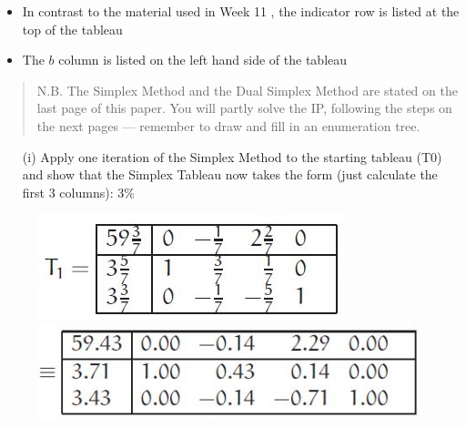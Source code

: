 \documentclass{beamer}
\begin{document}

\begin{frame}
\begin{itemize}
\item In contrast to the material used in Week 11 , the indicator row is listed at the top of the tableau
\item The $b$ column is listed on the left hand side of the tableau
\end{itemize}
\end{frame}
\begin{frame}
\begin{quote}
N.B. The Simplex Method and the Dual Simplex Method are stated on
the last page of this paper.
You will partly solve the IP, following the steps on the next pages — remember
to draw and fill in an enumeration tree.
\end{quote}
\end{frame}
\begin{frame}
\begin{itemize}
\item[(i)] Apply one iteration of the Simplex Method to the starting tableau
(T0) and show that the Simplex Tableau now takes the form (just
calculate the first 3 columns): 3\%
\end{itemize}

\end{frame}
\begin{frame}
\begin{figure}
\centering
\includegraphics[width=0.7\linewidth]{Exam14-b}\\
\includegraphics[width=0.7\linewidth]{Exam14-c}
\end{figure}
\end{frame}
\end{document}
